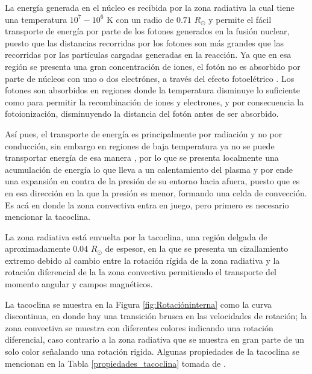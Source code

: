 La energía generada en el núcleo es recibida por la zona radiativa la cual tiene una temperatura $10^{7} - 10^{6}$ K con un radio de $0.71$ $R_{\odot}$ y permite el fácil transporte de energía por parte de los fotones generados en la fusión nuclear, puesto que las distancias recorridas por los fotones son más grandes que las recorridas por las partículas cargadas generadas en la reacción. Ya que en esa región se presenta una gran concentración de iones, el fotón no es absorbido por parte de núcleos con uno o dos electrónes, a través del efecto fotoelétrico . Los fotones son absorbidos en regiones donde la temperatura disminuye lo suficiente como para permitir la recombinación de iones y electrones, y por consecuencia la fotoionización, disminuyendo la distancia del fotón antes de ser absorbido. 

Así pues, el transporte de energía es principalmente por radiación y no por conducción, sin embargo en regiones de baja temperatura ya no se puede transportar energía de esa manera \parencite[e.g.,][]{judge-2020}, por lo que se presenta localmente una acumulación de energía lo que lleva a un calentamiento del plasma y por ende una expansión en contra de la presión de su entorno hacia afuera, puesto que es en esa dirección en la que la presión es menor, formando una celda de convección. Es acá en donde la zona convectiva entra en juego, pero primero es necesario mencionar la tacoclina.

La zona radiativa está envuelta por la tacoclina, una región delgada de aproximadamente $0.04$ $R_\odot$ de espesor, en la que se presenta un cizallamiento extremo debido al cambio entre la rotación rígida de la zona radiativa y la rotación diferencial de la la zona convectiva \parencite[e.g.,][]{strugarek-2023, spiegel-1992, ossendrijver-2003} permitiendo el transporte del momento angular y campos magnéticos.

La tacoclina se muestra en la Figura \ref{fig:Rotacióninterna} como la curva discontinua, en donde hay una transición brusca en las velocidades de rotación; la zona convectiva se muestra con diferentes colores indicando una rotación diferencial, caso contrario a la zona radiativa que se muestra en gran parte de un solo color señalando una rotación rigida. Algunas propiedades de la tacoclina se mencionan en la Tabla \ref{propiedades_tacoclina} tomada de \textcite[e.g.,][]{hughes-2007}.


